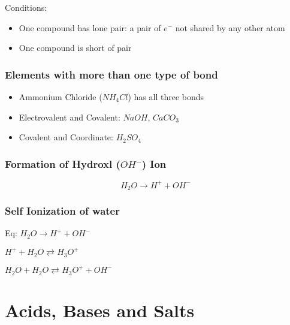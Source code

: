 \documentclass[a4paper]{article}
\begin{document}
	Conditions:
		\begin{itemize}
				\item One compound has lone pair: a pair of $e^-$ not shared by any other atom
				\item One compound is short of pair
		\end{itemize}

	\subsubsection{Elements with more than one type of bond}
	\begin{itemize}
		\item Ammonium Chloride ($NH_4Cl$) has all three bonds
		\item Electrovalent and Covalent: $NaOH$, $CaCO_3$
		\item Covalent and Coordinate: $H_2SO_4$
	\end{itemize}

	\subsubsection{Formation of Hydroxl ($OH^-$) Ion}
	\begin{equation}
		H_2O \to H^+ + OH^-
	\end{equation}

	\subsubsection{Self Ionization of water}
	Eq:
		$H_2O \to H^+ + OH^-$

		$H^+ + H_2O \rightleftarrows H_3O^+$

		$H_2O + H_2O \rightleftarrows H_3O^+ + OH^-$

	\section{Acids, Bases and Salts}
\end{document}
